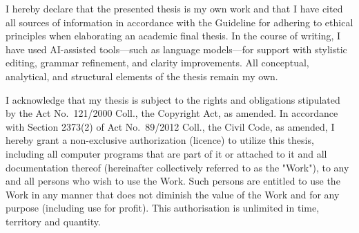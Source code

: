 \documentclass[english,bachelor,oneside]{ctufit-thesis} %
\begin{document}
\begin{declarationpage}
I hereby declare that the presented thesis is my own work and that I have cited all sources of information in accordance with the Guideline for adhering to ethical principles when elaborating an academic final thesis.  In the course of writing, I have used AI-assisted tools—such as language models—for support with stylistic editing, grammar refinement, and clarity improvements. All conceptual, analytical, and structural elements of the thesis remain my own.

I acknowledge that my thesis is subject to the rights and obligations stipulated by the Act No.~121/2000 Coll., the Copyright Act, as amended. In accordance with Section 2373(2) of Act No.~89/2012 Coll., the Civil Code, as amended, I hereby grant a non-exclusive authorization (licence) to utilize this thesis, including all computer programs that are part of it or attached to it and all documentation thereof (hereinafter collectively referred to as the "Work"), to any and all persons who wish to use the Work. Such persons are entitled to use the Work in any manner that does not diminish the value of the Work and for any purpose (including use for profit). This authorisation is unlimited in time, territory and quantity.
\end{declarationpage}

\printabstractpage %

%
%

\tableofcontents %
\end{document}
